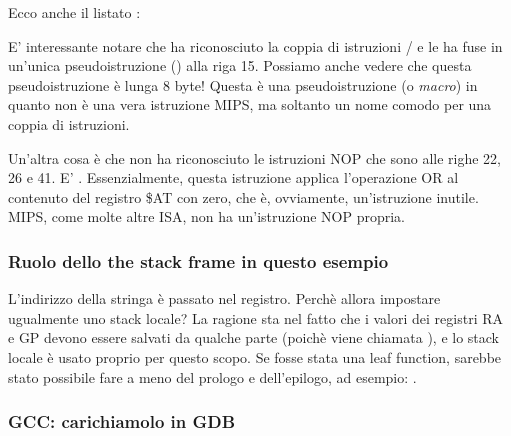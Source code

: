 Ecco anche il listato \IDA:




E' interessante notare che \IDA ha riconosciuto la coppia di istruzioni / e le ha fuse in un'unica pseudoistruzione
 () alla riga 15.
Possiamo anche vedere che questa pseudoistruzione è lunga 8 byte!
Questa è una pseudoistruzione (o \emph{macro}) in quanto non è una vera istruzione MIPS, ma soltanto un nome comodo per una coppia
di istruzioni.


Un'altra cosa è che \IDA non ha riconosciuto le istruzioni \ac{NOP} che sono alle righe 22, 26 e 41.
E' .
Essenzialmente, questa istruzione applica l'operazione OR al contenuto del registro \$AT
con zero, che è, ovviamente, un'istruzione inutile.
MIPS, come molte altre \ac{ISA}, non ha un'istruzione \ac{NOP} propria.

\subsubsection{Ruolo dello the stack frame in questo esempio}

L'indirizzo della stringa è passato nel registro.
Perchè allora impostare ugualmente uno stack locale?
La ragione sta nel fatto che i valori dei registri \ac{RA} e GP devono essere salvati da qualche parte
(poichè viene chiamata \printf ), e lo stack locale è usato proprio per questo scopo.
Se fosse stata una \gls{leaf function}, sarebbe stato possibile fare a meno del prologo e dell'epilogo,
ad esempio: .

\subsubsection{\Optimizing GCC: carichiamolo in GDB}


